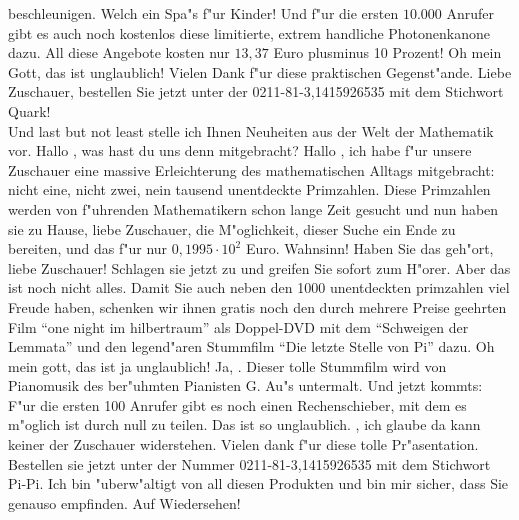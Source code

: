 \begin{verseplay}[7em]
                beschleunigen. Welch ein Spa"s f"ur Kinder!
\s{\QEDGuestB} Und f"ur die ersten $10.000$ Anrufer gibt es auch noch 
                kostenlos diese limitierte, extrem handliche Photonenkanone dazu. 
                All diese Angebote kosten nur $13,37$ Euro plusminus 10 Prozent!
\s{\QEDHost} Oh mein Gott, das ist unglaublich! Vielen Dank f"ur diese 
                praktischen Gegenst"ande. Liebe Zuschauer, bestellen Sie jetzt 
                unter der 0211-81-3,1415926535 mit dem Stichwort Quark!
                \\
                Und last but not least stelle ich Ihnen Neuheiten aus der Welt der 
                Mathematik vor. Hallo \QEDGuestC, was hast du uns denn mitgebracht?
\s{\QEDGuestC} Hallo \QEDHost, ich habe f"ur unsere Zuschauer eine massive 
                Erleichterung des mathematischen Alltags mitgebracht: nicht eine,
                nicht zwei, nein tausend unentdeckte Primzahlen. Diese Primzahlen 
                werden von f"uhrenden Mathematikern schon lange Zeit gesucht und 
                nun haben sie zu Hause, liebe Zuschauer, die M"oglichkeit, dieser 
                Suche ein Ende zu bereiten, und das f"ur nur $0,1995\cdot10^2$ Euro. 
\s{\QEDHost} Wahnsinn! Haben Sie das geh"ort, liebe Zuschauer! Schlagen sie 
                jetzt zu und greifen Sie sofort zum H"orer.
\s{\QEDGuestC} Aber das ist noch nicht alles. Damit Sie auch neben den 1000 
                unentdeckten primzahlen viel Freude haben, schenken wir ihnen 
                gratis noch den durch mehrere Preise geehrten Film "`one night im 
                hilbertraum"' als Doppel-DVD mit dem "`Schweigen der Lemmata"' und 
                den legend"aren Stummfilm "`Die letzte Stelle von Pi"' dazu. 
\s{\QEDHost} Oh mein gott, das ist ja unglaublich!
\s{\QEDGuestC} Ja, \QEDHost. Dieser tolle Stummfilm wird von Pianomusik des 
                ber"uhmten Pianisten G. Au"s untermalt. Und jetzt kommts: F"ur die 
                ersten 100 Anrufer gibt es noch einen Rechenschieber, mit dem es 
                m"oglich ist durch null zu teilen.
\s{\QEDHost} Das ist so unglaublich. \QEDGuestC, ich glaube da kann keiner 
                der Zuschauer widerstehen. Vielen dank f"ur diese tolle 
                Pr"asentation. Bestellen sie jetzt unter der Nummer 
                0211-81-3,1415926535 mit dem Stichwort Pi-Pi.
                Ich bin "uberw"altigt von all diesen Produkten und bin mir sicher, 
                dass Sie genauso empfinden. Auf Wiedersehen!
\end{verseplay}
